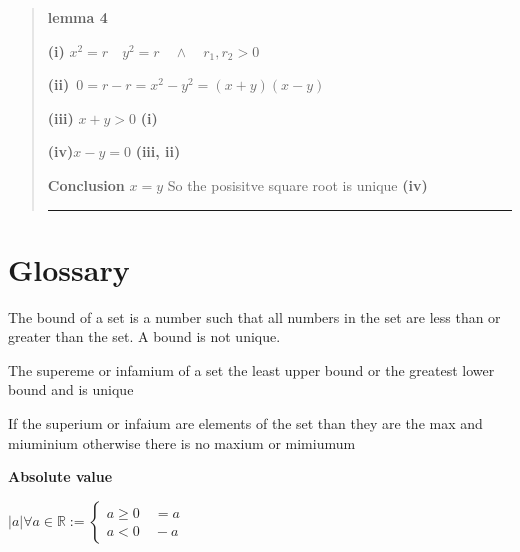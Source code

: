 \documentclass{tufte-book}
\providecommand{\tightlist}{%
  \setlength{\itemsep}{0pt}\setlength{\parskip}{0pt}}
\begin{document}
\begin{quote}
\textbf{lemma 4}

\textbf{(i)} \(x^2 = r \quad y^2 = r \quad \wedge \quad r_1, r_2 > 0\)

\textbf{(ii)} \(\, 0 = r - r = x^2 - y^2 = (x+y)(x-y)\)

\textbf{(iii)} \(x + y >0\) \textbf{(i)}

\textbf{(iv)}\(x-y = 0\) \textbf{(iii, ii)}

\textbf{Conclusion} \(x=y\) So the posisitve square root is unique
\textbf{(iv)}

\begin{center}\rule{0.5\linewidth}{\linethickness}\end{center}
\end{quote}\hypertarget{glossary}{%
\section{Glossary}\label{glossary}}

\begin{description}
\tightlist
\item[Bound]
The bound of a set is a number such that all numbers in the set are less
than or greater than the set. A bound is not unique.
\item[Supremum]
The supereme or infamium of a set the least upper bound or the greatest
lower bound and is unique
\item[Maximum and miniumium]
If the superium or infaium are elements of the set than they are the max
and miuminium otherwise there is no maxium or mimiumum
\end{description}\textbf{Absolute value}

\(|a| \forall a \in \mathbb{R} := \begin{cases} a \geq 0 \quad = a \\ a < 0 \quad -a \end{cases}\)
\end{document}
